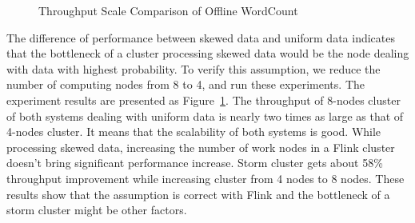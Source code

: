 \begin{figure}[t!]
\begin{center}
   \caption{Throughput Scale Comparison of Offline WordCount}
   \label{fig:offline_throughput_scale}
  \end{center}
\end{figure}

The difference of performance between skewed data and uniform data indicates that the bottleneck of a cluster processing skewed data would be the node dealing with data with highest probability. To verify this assumption, we reduce the number of computing nodes from 8 to 4, and run these experiments. The experiment results are presented as Figure~\ref{fig:offline_throughput_scale}. The throughput of 8-nodes cluster of both systems dealing with uniform data is nearly two times as large as that of 4-nodes cluster. It means that the scalability of both systems is good. While processing skewed data, increasing the number of work nodes in a Flink cluster doesn't bring significant performance increase. Storm cluster gets about 58\% throughput improvement while increasing cluster from 4 nodes to 8 nodes. These results show that the assumption is correct with Flink and the bottleneck of a storm cluster might be other factors.

